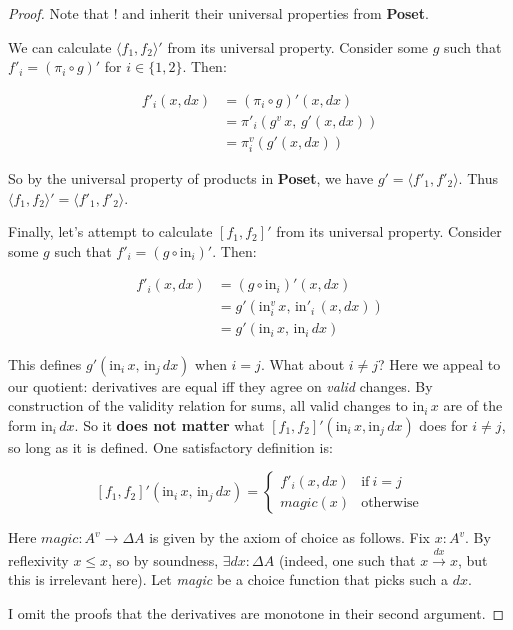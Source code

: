 \documentclass[nomarginums]{rntz}
\newcommand\cat\textbf
\newcommand\strong\textbf
\newcommand\Poset{\cat{Poset}}
\newcommand\D\Delta
\newcommand\injc{\mathrm{in}}
\newcommand\inj[1]{\injc_{#1}\,}
\newcommand\fname[1]{\textit{#1}}
\newcommand\validarrow{{\to}}
\newcommand\valid[1]{\mathrel{\overset{#1}{\validarrow}}}
\newcommand\vals[1]{#1^v} %
\newcommand\chgs[1]{\D{#1}}
\newcommand\fork[1]{\langle{#1}\rangle}
\newcommand\funct[1]{\vals{#1}}
\newcommand\deriv[1]{#1'}
\begin{document}
\begin{proof}
  \noindent
  Note that $!$ and {\textexclamdown} inherit their universal properties from
  \Poset{}.

  We can calculate $\deriv{\fork{f_1,f_2}}$ from its universal property.
  Consider some $g$ such that $\deriv f_i = \deriv{(\pi_i \circ g)}$ for $i \in
  \{1,2\}$. Then:

  \begin{align*}
    \deriv f_i(x,dx)
    &= \deriv{(\pi_i \circ g)}(x,dx)\\
    &= \deriv\pi_i (\funct g\,x,\, \deriv g(x,dx))\\
    &= \funct\pi_i(\deriv g(x,dx))
  \end{align*}

  \noindent
  So by the universal property of products in \Poset{}, we have $g' =
  \fork{\deriv f_1, \deriv f_2}$. Thus $\deriv{\fork{f_1,f_2}} = \fork{\deriv
    f_1, \deriv f_2}$.

  Finally, let's attempt to calculate $\deriv{[f_1,f_2]}$ from its universal
  property. Consider some $g$ such that $\deriv f_i = \deriv{(g \circ
    \injc_i)}$. Then:

  \begin{align*}
    \deriv f_i(x,dx)
    &= \deriv{(g \circ \injc_i)}(x,dx)\\
    &= \deriv g (\funct\injc_i \,x,\, \deriv\injc_i \,(x,dx))\\
    &= \deriv g (\inj i x,\, \inj i dx)
  \end{align*}

  \noindent
  This defines $g'(\inj i x,\, \inj j dx)$ when $i = j$. What about $i \ne j$?
  Here we appeal to our quotient: derivatives are equal iff they agree on
  \emph{valid} changes. By construction of the validity relation for sums, all
  valid changes to $\inj i x$ are of the form $\inj i dx$. So it \strong{does
    not matter} what $\deriv{[f_1,f_2]}(\inj i x, \inj j dx)$ does for $i \ne
  j$, so long as it is defined. One satisfactory definition is:

  \begin{equation*}
    \deriv{\left[f_1,f_2\right]} (\inj{i} x,\, \inj{j} dx)
    = \begin{cases}
      \deriv f_i(x,dx) & \text{if}~ i=j\\
      \fname{magic}(x) & \text{otherwise}
    \end{cases}
  \end{equation*}

  \noindent
  Here $\fname{magic} : \vals A \to \chgs A$ is given by the axiom of choice as
  follows. Fix $x : \vals A$. By reflexivity $x \le x$, so by soundness,
  $\exists dx : \chgs A$ (indeed, one such that $x \valid{dx} x$, but this is
  irrelevant here). Let \fname{magic} be a choice function that picks such a
  $dx$.

  I omit the proofs that the derivatives are monotone in their second argument.
\end{proof}
\end{document}

